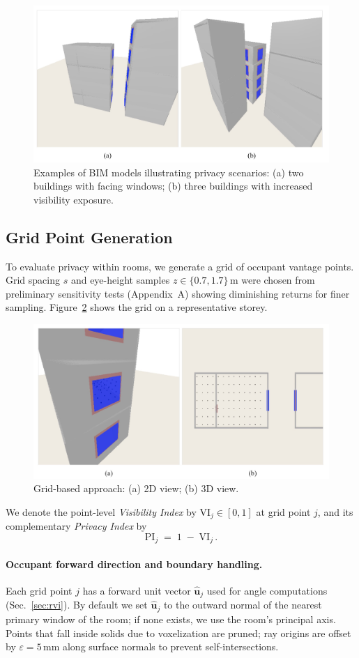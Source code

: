 \documentclass[final,3p,times,review]{elsarticle}
\begin{document}
\begin{figure}[ht!]
    \centering
    \includegraphics[width=0.6\linewidth]{bim_models.jpg}
    \caption{Examples of BIM models illustrating privacy scenarios: (a) two buildings with facing windows; (b) three buildings with increased visibility exposure.}
    \label{fig:bim_models}
\end{figure}


\subsection{Grid Point Generation}
To evaluate privacy within rooms, we generate a grid of occupant vantage points. Grid spacing $s$ and eye-height samples $z \in \{0.7,1.7\}\,\text{m}$ were chosen from preliminary sensitivity tests (Appendix~A) showing diminishing returns for finer sampling. Figure~\ref{fig:griding} shows the grid on a representative storey.

\begin{figure}[H]
\centering
\includegraphics[width=.6\textwidth]{Grid_based_appraoch.jpg} %
\caption{Grid-based approach: (a) 2D view; (b) 3D view.}
\label{fig:griding}
\end{figure}

We denote the point-level \emph{Visibility Index} by $\mathrm{VI}_j\in[0,1]$ at grid point $j$, and its complementary \emph{Privacy Index} by
\begin{equation}
\mathrm{PI}_j \;=\; 1 \;-\; \mathrm{VI}_j \,.
\label{eq:pi}
\end{equation}

\paragraph{Occupant forward direction and boundary handling.}
Each grid point $j$ has a forward unit vector $\hat{\mathbf{u}}_j$ used for angle computations (Sec.~\ref{sec:rvi}). By default we set $\hat{\mathbf{u}}_j$ to the outward normal of the nearest primary window of the room; if none exists, we use the room’s principal axis. Points that fall inside solids due to voxelization are pruned; ray origins are offset by $\varepsilon=5$\,mm along surface normals to prevent self-intersections.
\end{document}
